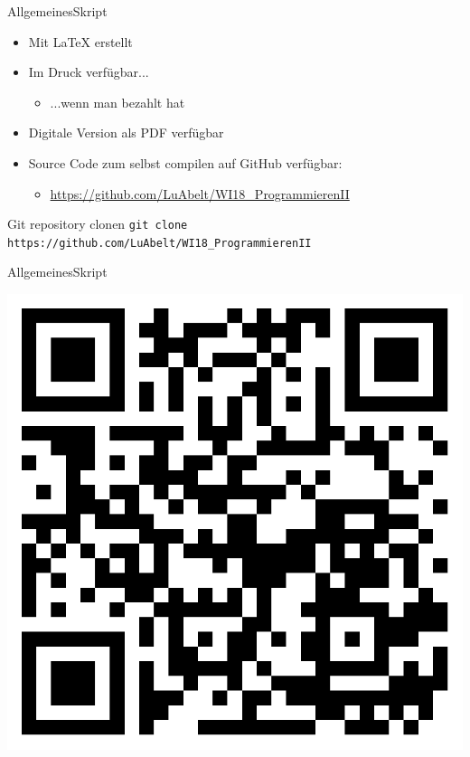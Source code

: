 
	
	
	

\begin{frame}{Allgemeines}{Skript}
	\begin{itemize}
		\item Mit \LaTeX{} erstellt
		\item Im Druck verfügbar...
		\begin{itemize}
			\item ...wenn man bezahlt hat
		\end{itemize}
		\item Digitale Version als PDF verfügbar
		\item Source Code zum selbst compilen auf GitHub verfügbar:
		\begin{itemize}
			\item \small{\url{https://github.com/LuAbelt/WI18\_ProgrammierenII}}
		\end{itemize}
	\end{itemize}
	\begin{block}{Git repository clonen}
		\tt{git clone https://github.com/LuAbelt/WI18\_ProgrammierenII}
	\end{block}
\end{frame}

\begin{frame}{Allgemeines}{Skript}
	{\small \setlength{\forkmeoffset}{2.5cm} \forkme[east]}
	\begin{minipage}{\textwidth}
		\centering	
		\includegraphics[height=0.6\textheight]{graph/gitqr.png}
	\end{minipage}
\end{frame}

